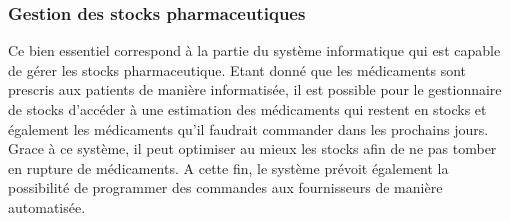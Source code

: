 \documentclass[12pt]{article}
\begin{document}
\subsubsection{Gestion des stocks pharmaceutiques}

Ce bien essentiel correspond à la partie du système informatique qui est capable de gérer les stocks pharmaceutique. Etant donné que les médicaments sont prescris aux patients de manière informatisée, il est possible pour le gestionnaire de stocks d'accéder à une estimation des médicaments qui restent en stocks et également les médicaments qu'il faudrait commander dans les prochains jours. Grace à ce système, il peut optimiser au mieux les stocks afin de ne pas tomber en rupture de médicaments. A cette fin, le système prévoit également la possibilité de programmer des commandes aux fournisseurs de manière automatisée. 
\end{document}
